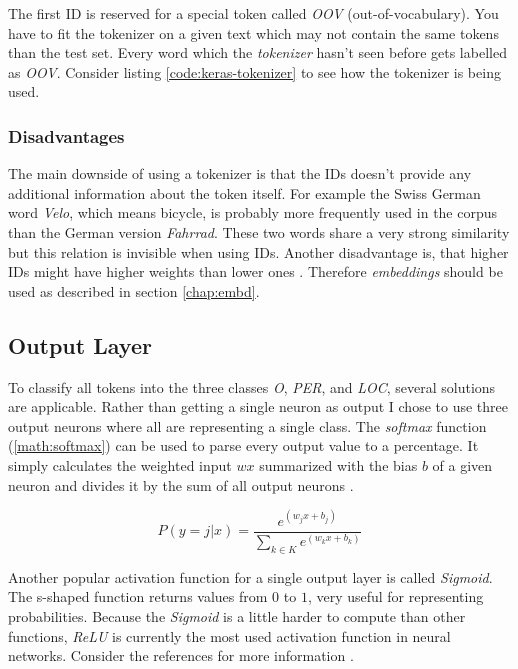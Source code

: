 The first ID is reserved for a special token called \emph{OOV} (out-of-vocabulary). You have to fit the tokenizer on a given text which may not contain the same tokens than the test set. Every word which the \emph{tokenizer} hasn't seen before gets labelled as \emph{OOV}. Consider listing \ref{code:keras-tokenizer} to see how the tokenizer is being used.

\subsubsection{Disadvantages}

The main downside of using a tokenizer is that the IDs doesn't provide any additional information about the token itself. For example the Swiss German word \emph{Velo}, which means bicycle, is probably more frequently used in the corpus than the German version \emph{Fahrrad}. These two words share a very strong similarity but this relation is invisible when using IDs. Another disadvantage is, that higher IDs might have higher weights than lower ones \cite{nurz18}. Therefore \emph{embeddings} should be used as described in section \ref{chap:embd}.

\subsection{Output Layer}

To classify all tokens into the three classes \emph{O}, \emph{PER}, and \emph{LOC}, several solutions are applicable. Rather than getting a single neuron as output I chose to use three output neurons where all are representing a single class. The \emph{softmax} function (\ref{math:softmax}) can be used to parse every output value to a percentage. It simply calculates the weighted input $wx$ summarized with the bias $b$ of a given neuron and divides it by the sum of all output neurons \cite{soft}.

\begin{equation}
    \label{math:softmax}
    P(y=j | x) = \frac{e^{(w_jx+b_j)}}{\sum_{k \in K} e^{(w_kx+b_k)}}
\end{equation}

Another popular activation function for a single output layer is called \emph{Sigmoid}. The s-shaped function returns values from $0$ to $1$, very useful for representing probabilities. Because the \emph{Sigmoid} is a little harder to compute than other functions, \emph{ReLU} is currently the most used activation function in neural networks. Consider the references for more information \cite{act17}.

